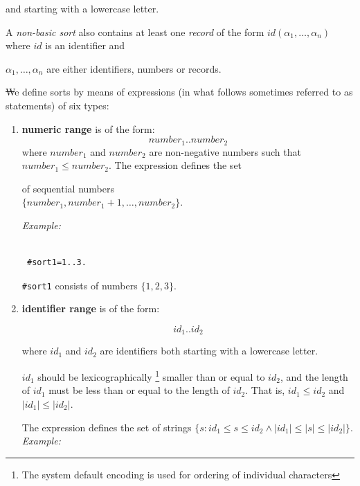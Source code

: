 \documentclass[12pt, letterpaper]{article}
\begin{document}
and starting with a lowercase letter.



A \textit{non-basic sort} also contains at least one \textit{record} of the form $id(\alpha_1,\dots, \alpha_n)$ where $id$ is an identifier and 

$\alpha_1, \dots, \alpha_n$ are either identifiers, numbers or records. 



\st We define sorts by means of expressions (in what follows sometimes referred to as statements) of six types:
\begin{enumerate}


\item
\textbf{numeric range} is of the form:
\begin{equation*}
number_1..number_2
\end{equation*}
where $number_1$ and $number_2$ are non-negative numbers such that $number_1 \le number_2$. The expression defines the set 

of sequential numbers \\$\{number_1, number_1+1, \dots, number_2\}$.



\textit{Example:}



\begin{verbatim}

 #sort1=1..3.

\end{verbatim}

\texttt{\#sort1} consists of numbers $\{1,2,3\}$.


\item \textbf{identifier range} is of the form:

\begin{equation*}
  id_1..id_2
\end{equation*}

where $id_1$ and $id_2$ are identifiers both starting with a lowercase letter.

$id_1$ should be lexicographically \footnote{ The system default encoding is used for  ordering of individual characters} smaller than or equal to  $id_2$, and the length of $id_1$ must be less than or equal to the length of $id_2$. That is,  $id_1 \leq id_2$ and $|id_1| \leq |id_2|$.

The expression defines the set of strings  $\{s: id_1\leq s \leq id_2 \land |id_1|\leq |s| \leq |id_2|\}$.
\textit{Example:}


\end{enumerate}
\end{document}
